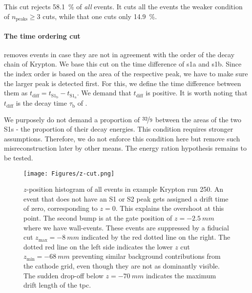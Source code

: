 This cut rejects \SI{58.1}{\%} of \emph{all} events. %
It cuts all the events the weaker condition of $ n_\mathrm{peaks} \ge 3 $ cuts, while that one cuts only \SI{14.9}{\%}.


\paragraph{The time ordering cut} removes events in case they are not in agreement with the order of the decay chain of Krypton.
We base this cut on the time difference of \gls{s1a} and \gls{s1b}.
Since the index order is based on the area of the respective peak, we have to make sure the larger peak is detected first.
For this, we define the time difference between them as $t_\mathrm{diff} = t_{\mathrm{S}1_\mathrm{b}} - t_{\mathrm{S}1_\mathrm{a}}$.
We demand that $t_\mathrm{diff}$ is positive.
It is worth noting that $t_\mathrm{diff}$ is the decay time $\tau_\mathrm{b}$ of . %

We purposely do not demand a proportion of $ \nicefrac{32}{9} $ between the areas of the two S1s - the proportion of their decay energies.
This condition requires stronger assumptions.
Therefore, we do not enforce this condition here but remove such misreconstruction later by other means.
The energy ration hypothesis remains to be tested.

\begin{figure}[H]
    \centering
    \texttt{[image: Figures/z-cut.png]}  %
    \caption[Fiducial z-cut]{
        $ z $-position histogram of all events in example Krypton run 250.
    An event that does not have an S1 or S2 peak gets assigned a drift time of zero, corresponding to $ z = 0 $.
    This explains the overshoot at this point.
    The second bump is at the gate position of $ z = \SI{-2.5}{mm}$ where we have wall-events.
    These events are suppressed by a fiducial cut $ z_\mathrm{max} = \SI{-8}{mm}$ indicated by the red dotted line on the right.
    The dotted red line on the left side indicates the lower $z$ cut $ z_\mathrm{min} = \SI{-68}{mm}$ preventing similar background contributions from the cathode grid,
    even though they are not as dominantly visible.
    The sudden drop-off below $ z = \SI{-70}{mm}$ indicates the maximum drift length of the \gls{tpc}.
    }
    \label{fig:fid-z-cut}
\end{figure}

